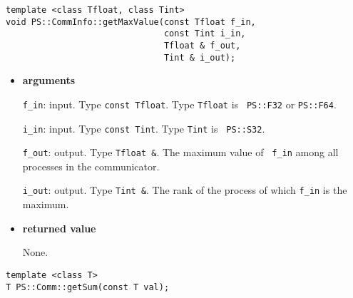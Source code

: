 \begin{screen}
\begin{verbatim}
template <class Tfloat, class Tint>
void PS::CommInfo::getMaxValue(const Tfloat f_in,
                               const Tint i_in,
                               Tfloat & f_out,
                               Tint & i_out);
\end{verbatim}
\end{screen}

\begin{itemize}

\item{\bf arguments}

{\tt f\_in}: input. Type {\tt const Tfloat}. Type {\tt Tfloat} is {\tt
PS::F32} or {\tt PS::F64}.

{\tt i\_in}: input. Type {\tt const Tint}. Type {\tt Tint} is {\tt
PS::S32}.

{\tt f\_out}: output. Type {\tt Tfloat \&}. The maximum value of {\tt
f\_in} among all processes in the communicator.

{\tt i\_out}: output. Type {\tt Tint \&}. The rank of the process of
which {\tt f\_in} is the maximum.

\item{\bf returned value}

None.









\end{itemize}


\begin{screen}
\begin{verbatim}
template <class T>
T PS::Comm::getSum(const T val);
\end{verbatim}
\end{screen}

